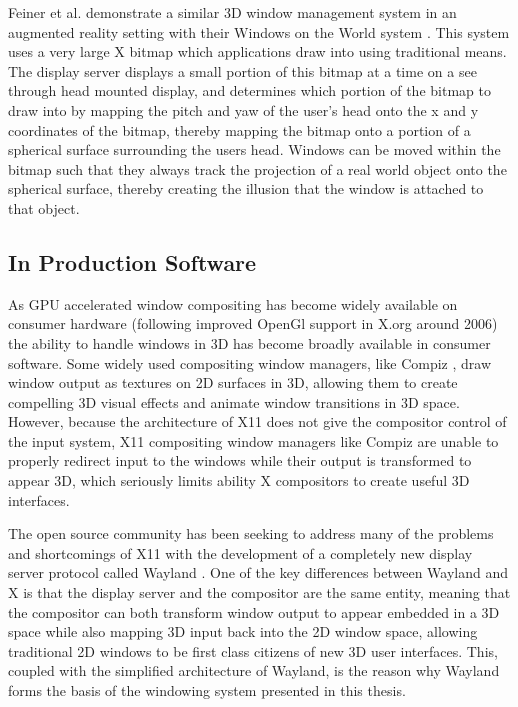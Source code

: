 Feiner et al. demonstrate a similar 3D window management system in an augmented reality setting with their Windows on the World system \cite{wotw}. This system uses a very large X bitmap which applications draw into using traditional means. The display server displays a small portion of this bitmap at a time on a see through head mounted display, and determines which portion of the bitmap to draw into by mapping the pitch and yaw of the user's head onto the x and y coordinates of the bitmap, thereby mapping the bitmap onto a portion of a spherical surface surrounding the users head. Windows can be moved within the bitmap such that they always track the projection of a real world object onto the spherical surface, thereby creating the illusion that the window is attached to that object.
 
\subsection{In Production Software}

As GPU accelerated window compositing has become widely available on consumer hardware (following improved OpenGl support in X.org around 2006) the ability to handle windows in 3D has become broadly available in consumer software.  Some widely used compositing window managers, like Compiz \cite{compiz}, draw window output as textures on 2D surfaces in 3D, allowing them to create compelling 3D visual effects and animate window transitions in 3D space. However, because the architecture of X11 does not give the compositor control of the input system, X11 compositing window managers like Compiz are unable to properly redirect input to the windows while their output is transformed to appear 3D, which seriously limits ability X compositors to create useful 3D interfaces.

The open source community has been seeking to address many of the problems and shortcomings of X11 with the development of a completely new display server protocol called Wayland \cite{wayland}. One of the key differences between Wayland and X is that the display server and the compositor are the same entity, meaning that the compositor can both transform window output to appear embedded in a 3D space while also mapping 3D input back into the 2D window space, allowing traditional 2D windows to be first class citizens of new 3D user interfaces. This, coupled with the simplified architecture of Wayland, is the reason why Wayland forms the basis of the windowing system presented in this thesis.

